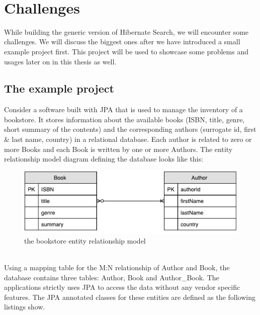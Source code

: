 
~
\pagebreak

\section{Challenges}\label{Challenges}
While building the generic version of Hibernate Search, we will encounter some challenges. We will discuss the biggest ones after we have introduced a small example project first. This project will be used to showcase some problems and usages later on in this thesis as well.

\subsection{The example project} \label{example_project}
Consider a software built with JPA that is used to manage the inventory of a bookstore. It stores information about the available books (ISBN, title, genre, short summary of the contents) and the corresponding authors (surrogate id, first \& last name, country) in a relational database. Each author is related to zero or more Books and each Book is written by one or more Authors. The entity relationship model diagram defining the database looks like this:
\\
\begin{figure}[ht]
	\centering
	\includegraphics[scale = 0.9]{images/Sample_Project_ER.pdf}
	\caption{the bookstore entity relationship model}
	\label{fig3}
\end{figure}
\\
Using a mapping table for the M:N relationship of Author and Book, the database contains three tables: Author, Book and Author\_Book. The applications strictly uses JPA to access the data without any vendor specific features. The JPA annotated classes for these entities are defined as the following listings show.

\pagebreak

